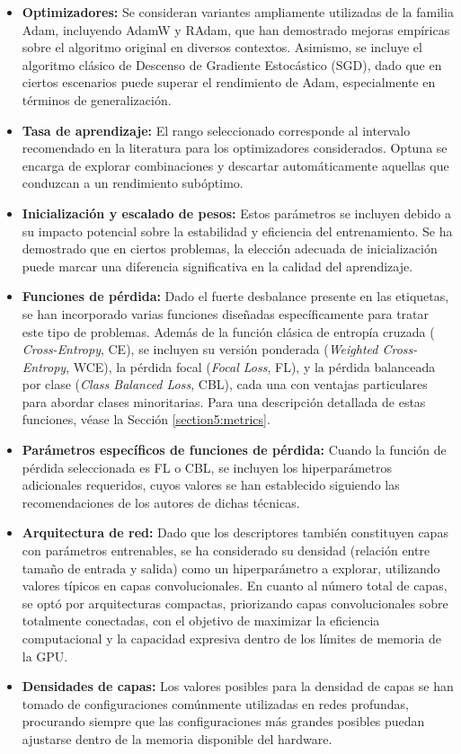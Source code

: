 \begin{itemize}
    \item \textbf{Optimizadores:} Se consideran variantes ampliamente utilizadas de la familia Adam, incluyendo AdamW y RAdam, que han demostrado mejoras empíricas sobre el algoritmo original en diversos contextos. Asimismo, se incluye el algoritmo clásico de Descenso de Gradiente Estocástico (SGD), dado que en ciertos escenarios puede superar el rendimiento de Adam, especialmente en términos de generalización.
    \item \textbf{Tasa de aprendizaje:} El rango seleccionado corresponde al intervalo recomendado en la literatura para los optimizadores considerados. Optuna se encarga de explorar combinaciones y descartar automáticamente aquellas que conduzcan a un rendimiento subóptimo. 
    \item \textbf{Inicialización y escalado de pesos:} Estos parámetros se incluyen debido a su impacto potencial sobre la estabilidad y eficiencia del entrenamiento. Se ha demostrado que en ciertos problemas, la elección adecuada de inicialización puede marcar una diferencia significativa en la calidad del aprendizaje.
    \item \textbf{Funciones de pérdida:} Dado el fuerte desbalance presente en las etiquetas, se han incorporado varias funciones diseñadas específicamente para tratar este tipo de problemas. Además de la función clásica de entropía cruzada ( \textit{Cross-Entropy}, CE), se incluyen su versión ponderada (\textit{Weighted Cross-Entropy}, WCE), la pérdida focal (\textit{Focal Loss}, FL), y la pérdida balanceada por clase (\textit{Class Balanced Loss}, CBL), cada una con ventajas particulares para abordar clases minoritarias. Para una descripción detallada de estas funciones, véase la Sección \ref{section5:metrics}.
    \item \textbf{Parámetros específicos de funciones de pérdida:} Cuando la función de pérdida seleccionada es FL o CBL, se incluyen los hiperparámetros adicionales requeridos, cuyos valores se han establecido siguiendo las recomendaciones de los autores de dichas técnicas.
    \item \textbf{Arquitectura de red:} Dado que los descriptores también constituyen capas con parámetros entrenables, se ha considerado su densidad (relación entre tamaño de entrada y salida) como un hiperparámetro a explorar, utilizando valores típicos en capas convolucionales. En cuanto al número total de capas, se optó por arquitecturas compactas, priorizando capas convolucionales sobre totalmente conectadas, con el objetivo de maximizar la eficiencia computacional y la capacidad expresiva dentro de los límites de memoria de la GPU.
    \item \textbf{Densidades de capas:} Los valores posibles para la densidad de capas se han tomado de configuraciones comúnmente utilizadas en redes profundas, procurando siempre que las configuraciones más grandes posibles puedan ajustarse dentro de la memoria disponible del hardware.
\end{itemize}

